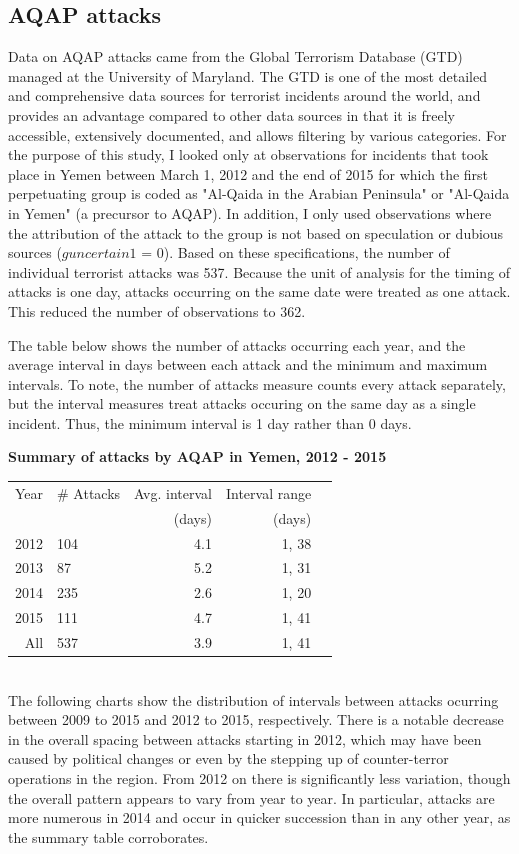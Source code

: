 \documentclass[letterpaper,12pt]{article}
\theoremstyle{definition}
\begin{document}
\subsection{AQAP attacks}

Data on AQAP attacks came from the Global Terrorism Database (GTD) managed at the University of Maryland. The GTD is one of the most detailed and comprehensive data sources for terrorist incidents around the world, and provides an advantage compared to other data sources in that it is freely accessible, extensively documented, and allows filtering by various categories. For the purpose of this study, I looked only at observations for incidents that took place in Yemen between March 1, 2012 and the end of 2015 for which the first perpetuating group is coded as "Al-Qaida in the Arabian Peninsula" or "Al-Qaida in Yemen" (a precursor to AQAP). In addition, I only used observations where the attribution of the attack to the group is not based on speculation or dubious sources ($guncertain1$ = 0). Based on these specifications, the number of individual terrorist attacks was 537. Because the unit of analysis for the timing of attacks is one day, attacks occurring on the same date were treated as one attack. This reduced the number of observations to 362.

The table below shows the number of attacks occurring each year, and the average interval in days between each attack and the minimum and maximum intervals. To note, the number of attacks measure counts every attack separately, but the interval measures treat attacks occuring on the same day as a single incident. Thus, the minimum interval is 1 day rather than 0 days.

\noindent\textbf{Summary of attacks by AQAP in Yemen, 2012 - 2015}\\
\begin{tabular}{rlrrl}
  \hline
Year & \# Attacks & Avg. interval & Interval range \\ 
&&(days)&(days)\\
  \hline
2012 & 104 & 4.1 & 1, 38 \\ 
  2013 &  87 & 5.2 & 1, 31 \\ 
  2014 & 235 & 2.6 & 1, 20 \\ 
  2015 & 111 & 4.7 & 1, 41 \\ 
  \hline
  All & 537 & 3.9 & 1, 41 \\ 
   \hline
\end{tabular}
\\

The following charts show the distribution of intervals between attacks ocurring between 2009 to 2015 and 2012 to 2015, respectively. There is a notable decrease in the overall spacing between attacks starting in 2012, which may have been caused by political changes or even by the stepping up of counter-terror operations in the region. From 2012 on there is significantly less variation, though the overall pattern appears to vary from year to year. In particular, attacks are more numerous in 2014 and occur in quicker succession than in any other year, as the summary table corroborates.
\end{document}
